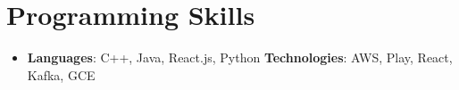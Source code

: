 \documentclass[letterpaper,11pt]{article}
\newcommand{\resumeSubHeadingListStart}{\begin{itemize}[leftmargin=*]}
\newcommand{\resumeSubHeadingListEnd}{\end{itemize}}
\begin{document}
\section{Programming Skills}
  \resumeSubHeadingListStart
    \item{
      \textbf{Languages}{: C++, Java, React.js, Python}
      \hfill
      \textbf{Technologies}{: AWS, Play, React, Kafka, GCE}
    }
  \resumeSubHeadingListEnd


\end{document}
